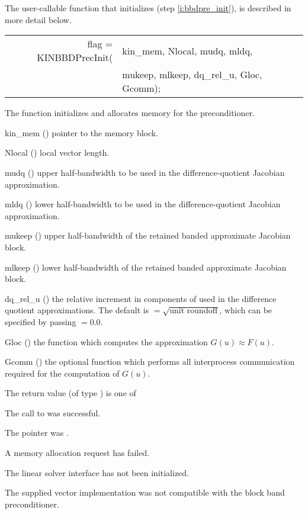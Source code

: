 The user-callable function that initializes {\kinbbdpre} (step \ref{i:bbdpre_init}),
is described in more detail below.
{
   \begin{tabular}[t]{@{}r@{}l@{}}
     flag = KINBBDPrecInit(&kin\_mem, Nlocal, mudq, mldq, \\
                           &mukeep, mlkeep, dq\_rel\_u, Gloc, Gcomm);
   \end{tabular}
}
{
  The function  initializes and allocates
  memory for the {\kinbbdpre} preconditioner.
}
{
  \begin{args}[dq\_rel\_u]
  \item[kin\_mem] ()
    pointer to the {\kinsol} memory block.
  \item[Nlocal] ()
    local vector length.
  \item[mudq] ()
    upper half-bandwidth to be used in the difference-quotient Jacobian approximation.
  \item[mldq] ()
    lower half-bandwidth to be used in the difference-quotient Jacobian approximation.
  \item[mukeep] ()
    upper half-bandwidth of the retained banded approximate Jacobian block.
  \item[mlkeep] ()
    lower half-bandwidth of the retained banded approximate Jacobian block.
  \item[dq\_rel\_u] ()
    the relative increment in components of  used in the difference quotient
    approximations.  The default is $ = \sqrt{\text{unit roundoff}}$,
    which can be specified by passing $ = 0.0$.
  \item[Gloc] ()
    the {\CC} function which computes the approximation $G(u) \approx F(u)$.
  \item[Gcomm] ()
    the optional {\CC} function which performs all interprocess communication required for
    the computation of $G(u)$.
  \end{args}
}
{
  The return value  (of type ) is one of
  \begin{args}
  \item[\id{KINLS\_SUCCESS}]
    The call to  was successful.
  \item[\id{KINLS\_MEM\_NULL}]
    The  pointer was .
  \item[\Id{KINLS\_MEM\_FAIL}]
    A memory allocation request has failed.
  \item[\Id{KINLS\_LMEM\_NULL}]
    The {\kinls} linear solver interface has not been initialized.
  \item[\Id{KINLS\_ILL\_INPUT}]
    The supplied vector implementation was not compatible with the block band preconditioner.
  \end{args}
}
